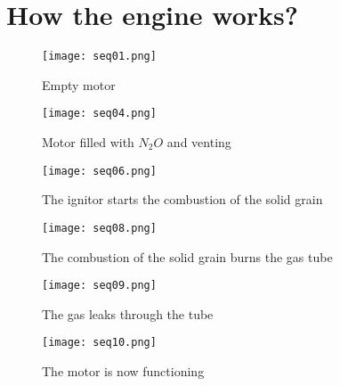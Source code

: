 
\section*{How the engine works?}

\begin{figure}[H]
  \centering
  \texttt{[image: seq01.png]}
  \caption{Empty motor}
  \label{fig:emptyMotor}
\end{figure}

\begin{figure}[H]
  \centering
  \texttt{[image: seq04.png]}
  \caption{Motor filled with $N_2O$ and venting}
  \label{fig:filledMotor}
\end{figure}

\begin{figure}[H]
  \centering
  \texttt{[image: seq06.png]}
  \caption{The ignitor starts the combustion of the solid grain}
  \label{fig:startSolidBurnMotor}
\end{figure}

\begin{figure}[H]
  \centering
  \texttt{[image: seq08.png]}
  \caption{The combustion of the solid grain burns the gas tube}
  \label{fig:solidBurningMotor}
\end{figure}

\begin{figure}[H]
  \centering
  \texttt{[image: seq09.png]}
  \caption{The gas leaks through the tube}
  \label{fig:gasLeakingMotor}
\end{figure}

\begin{figure}[H]
  \centering
  \texttt{[image: seq10.png]}
  \caption{The motor is now functioning}
  \label{fig:functioningMotor}
\end{figure}
